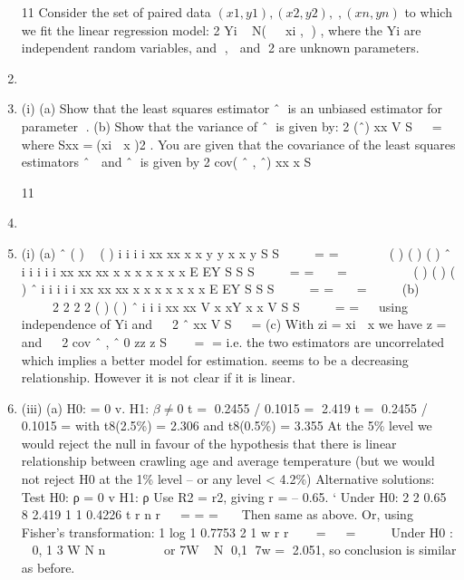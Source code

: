 \documentclass[a4paper,12pt]{article}
\begin{document}
\begin{enumerate}

11 Consider the set of paired data $(x1, y1), (x2 , y2 ),,(xn , yn )$ to which we fit the linear regression model:
  2
Yi ~ N(  xi , ) ,
where the Yi are independent random variables, and ,  and 2 are unknown
parameters.
\item \item (i) (a) Show that the least squares estimator ˆ is an unbiased estimator for
parameter .
(b) Show that the variance of ˆ is given by:
  2
(ˆ)
xx
V
S

 \;=\;
where Sxx \;=\;(xi  x )2 .
You are given that the covariance of the least squares estimators ˆ  and ˆ is
given by
2
cov( ˆ , ˆ)
xx
x
S

11 \item \item (i) (a)
ˆ ( )  ( )
i i i i
xx xx
x x y y x x y
S S
  
 \;=\; \;=\;  
    ( ) ( ) ( )
ˆ i i i i
i
xx xx xx
x x x x x x x
E EY
S S S
  
 \;=\; \;=\;   \;=\;    
    ( ) ( ) ( )
ˆ i i i i
i
xx xx xx
x x x x x x x
E EY
S S S
  
 \;=\; \;=\;   \;=\;    
(b)    
   
2 2
2 2
( ) ( )
ˆ i i i
xx xx
V x xY x x
V
S S
  
 \;=\; \;=\;   using independence of Yi
and   2
ˆ
xx
V
S

 \;=\;
(c) With zi \;=\; xi  x we have z \;= and   2
cov ˆ , ˆ 0
zz
z
S

  \;=\; \;=\;
i.e. the two estimators are uncorrelated which implies a better model for estimation.
\itemThere seems to be a decreasing relationship. However it is not clear if it is linear.
\item (iii) (a) H0: \beta = 0 v. H1: $\beta \neq 0$
t \;=\; 0.2455 / 0.1015 \;=\; 2.419 t \;=\; 0.2455 / 0.1015 \;=
with t8(2.5\%) = 2.306 and t8(0.5\%) = 3.355
At the 5\% level we would reject the null in favour of the hypothesis that there is linear relationship between crawling age and average
temperature (but we would not reject H0 at the 1\% level – or any
             level < 4.2\%)
Alternative solutions:
  Test H0: ρ = 0 v H1: ρ 
Use R2 = r2, giving r = – 0.65.
` Under H0:
  2
2 0.65 8 2.419
1 1 0.4226
t r n
r
 
\;=\; \;=\; \;=\;
 
Then same as above.
Or, using Fisher’s transformation:
  1 log 1 0.7753
2 1
w r
r
   \;=\;   \;=\;    
Under H0 :
  ~ 0, 1
3
W N
n
 
    
or 7W ~ N 0,1
7w \;=\; 2.051, so conclusion is similar as before.

\end{enumerate}
\end{document}
